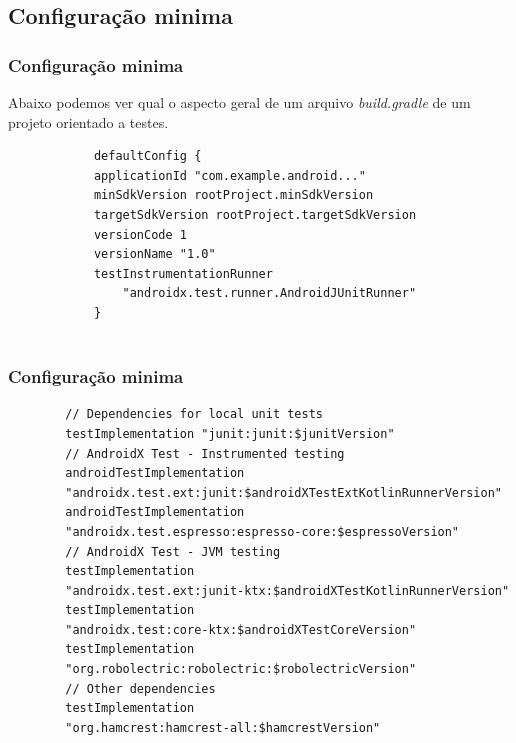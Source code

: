 \documentclass{beamer}
\begin{document}
\subsection{Configuração minima}
\begin{frame} [fragile]
	\frametitle{Configuração minima}
	Abaixo podemos ver qual o aspecto geral de um arquivo \textit{build.gradle} de um projeto orientado a testes.
	\newline 
	\begin{example}
		\begin{lstlisting}
			defaultConfig {
			applicationId "com.example.android..."
			minSdkVersion rootProject.minSdkVersion
			targetSdkVersion rootProject.targetSdkVersion
			versionCode 1
			versionName "1.0"
			testInstrumentationRunner 
				"androidx.test.runner.AndroidJUnitRunner"
			}
			
		\end{lstlisting}
	\end{example}
	
\end{frame}

\begin{frame} [fragile]
	\frametitle{Configuração minima}
	
	\begin{example}
		\begin{lstlisting}
		// Dependencies for local unit tests
		testImplementation "junit:junit:$junitVersion"
		// AndroidX Test - Instrumented testing
		androidTestImplementation 
		"androidx.test.ext:junit:$androidXTestExtKotlinRunnerVersion"
		androidTestImplementation 
		"androidx.test.espresso:espresso-core:$espressoVersion"
		// AndroidX Test - JVM testing
		testImplementation 
		"androidx.test.ext:junit-ktx:$androidXTestKotlinRunnerVersion"
		testImplementation 
		"androidx.test:core-ktx:$androidXTestCoreVersion"
		testImplementation 
		"org.robolectric:robolectric:$robolectricVersion"
		// Other dependencies
		testImplementation 
		"org.hamcrest:hamcrest-all:$hamcrestVersion"
		
		\end{lstlisting}
	\end{example}
	
\end{frame}


\end{document}
